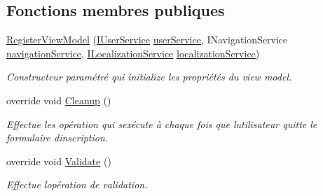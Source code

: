 \subsection*{Fonctions membres publiques}
\begin{DoxyCompactItemize}
\item 
\hyperlink{class_boxes_1_1_view_models_1_1_register_view_model_a4b1dc5b91c6d02f442729cec8b04a399}{Register\+View\+Model} (\hyperlink{interface_boxes_1_1_services_1_1_user_1_1_i_user_service}{I\+User\+Service} \hyperlink{class_boxes_1_1_view_models_1_1_register_view_model_acb915d2826a23f07e311c904ddf6fac9}{user\+Service}, I\+Navigation\+Service \hyperlink{class_boxes_1_1_view_models_1_1_register_view_model_afcceb72df99eab11056fff6f93847e17}{navigation\+Service}, \hyperlink{interface_boxes_1_1_services_1_1_localization_1_1_i_localization_service}{I\+Localization\+Service} \hyperlink{class_boxes_1_1_view_models_1_1_register_view_model_a7ebf08d118dd2ad8ef90d36373b1185f}{localization\+Service})
\begin{DoxyCompactList}\small\item\em Constructeur paramétré qui initialize les propriétés du view model. \end{DoxyCompactList}\item 
override void \hyperlink{class_boxes_1_1_view_models_1_1_register_view_model_aaf8c4826e523ddd70f2d47bdc4182586}{Cleanup} ()
\begin{DoxyCompactList}\small\item\em Effectue les opération qui s\textquotesingle{}exécute à chaque fois que l\textquotesingle{}utilisateur quitte le formulaire d\textquotesingle{}inscription. \end{DoxyCompactList}\item 
override void \hyperlink{class_boxes_1_1_view_models_1_1_register_view_model_a22d6527067ce51cae0e52ec7fb98fb6a}{Validate} ()
\begin{DoxyCompactList}\small\item\em Effectue l\textquotesingle{}opération de validation.  \end{DoxyCompactList}\end{DoxyCompactItemize}
